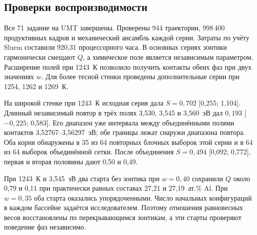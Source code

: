 \subsection*{Проверки воспроизводимости}
Все 71 задание на UMT завершены. Проверены 944 траектории, 998\,400 продуктивных кадров и механический ансамбль каждой серии. Затраты по учёту Slurm составили 920,31 процессорного часа. В основных сериях зонтики гармонически смещают \(Q\), а химическое поле является независимым параметром. Расширение полей при 1243~К позволило получить контакты обеих фаз при двух значениях \(w\). Для более тесной стенки проведены дополнительные серии при 1254, 1262 и 1269~К.

На широкой стенке при 1243~К исходная серия дала \(S=0{,}702\) [0,255; 1,104]. Длинный независимый повтор в трёх полях 3,530, 3,545 и 3,560~эВ дал \(0{,}193\) [\(-0{,}225\); 0,583]. Его диапазон уже интервала между объединёнными полями контактов 3,52767--3,56297~эВ; обе границы лежат снаружи диапазона повтора. Оба корня обнаружены в 35 из 64 повторных блочных выборок этой серии и в 64 из 64 выборок объединённой сетки. После объединения \(S=0{,}494\) [0,092; 0,772], первая и вторая половины дают 0,50 и 0,49.

При 1243~К и 3,545~эВ два старта без зонтика при \(w=0{,}40\) сохранили \(Q\) около 0,79 и 0,11 при практически равных составах 27,21 и 27,19~ат.\% Al. При \(w=0{,}35\) оба старта оказались упорядоченными. Число начальных конфигураций в каждом бассейне задаётся исследователем. Поэтому отношения равновесных весов восстановлены по перекрывающимся зонтикам, а эти старты проверяют поведение фаз независимо.
